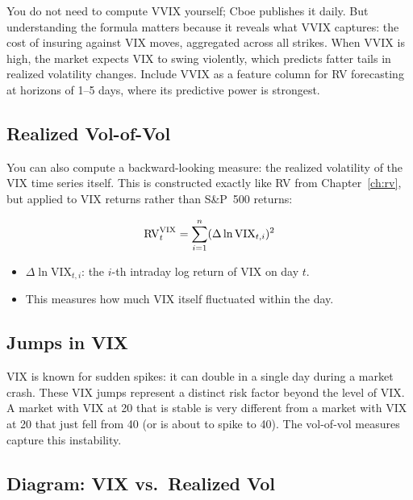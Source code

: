 \begin{projectconnection}
You do not need to compute VVIX yourself; Cboe publishes it daily.
But understanding the formula matters because it reveals what VVIX captures: the cost of insuring against VIX moves, aggregated across all strikes.
When VVIX is high, the market expects VIX to swing violently, which predicts fatter tails in realized volatility changes.
Include VVIX as a feature column for RV forecasting at horizons of 1--5 days, where its predictive power is strongest.
\end{projectconnection}

\subsection{Realized Vol-of-Vol}

You can also compute a backward-looking measure: the realized volatility of the VIX time series itself.
This is constructed exactly like RV from Chapter~\ref{ch:rv}, but applied to VIX returns rather than S\&P~500 returns:

\begin{equation}
  \operatorname{RV}^{\text{VIX}}_t = \sum_{i=1}^{n} (\Delta \ln \text{VIX}_{t,i})^2
  \label{eq:rv-vix}
\end{equation}
\begin{itemize}[nosep]
  \item $\Delta \ln \text{VIX}_{t,i}$: the $i$-th intraday log return of VIX on day $t$.
  \item This measures how much VIX itself fluctuated within the day.
\end{itemize}

\subsection{Jumps in VIX}

VIX is known for sudden spikes: it can double in a single day during a market crash.
These VIX jumps represent a distinct risk factor beyond the level of VIX.
A market with VIX at 20 that is stable is very different from a market with VIX at 20 that just fell from 40 (or is about to spike to 40).
The vol-of-vol measures capture this instability.

\subsection{Diagram: VIX vs.\ Realized Vol}

